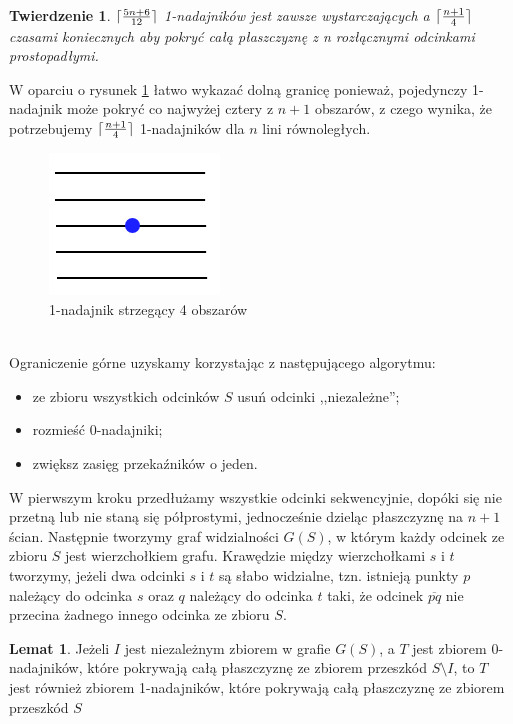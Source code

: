 \documentclass[brudnopis]{xmgr}
\DeclarePairedDelimiter\ceil{\lceil}{\rceil}
\newtheorem{Twierdzenie}{Twierdzenie} \theoremstyle{definition}
\newtheorem{Lemat}{Lemat} \theoremstyle{definition}
\begin{document}
\begin{Twierdzenie} \label{ograniczenie zbiór odcinków prostopadłych}
  $\ceil{\frac{5n+6}{12}}$ 1-nadajników jest zawsze wystarczających a $\ceil{\frac{n+1}{4}}$ czasami koniecznych aby pokryć całą płaszczyznę z n rozłącznymi odcinkami prostopadłymi.
\end{Twierdzenie}
\indent W oparciu o rysunek \ref{fig:ogr_dolne} łatwo wykazać dolną granicę ponieważ, pojedynczy 1-nadajnik może pokryć co najwyżej cztery z $n + 1$ obszarów, z czego wynika, że potrzebujemy $\ceil{\frac{n+1}{4}}$ 1-nadajników dla $n$ lini równoległych.
\begin{figure}[ht!]
  \centering
  \includegraphics{rysunki/k_nadajniki_ogr_dolne.png}
  \caption{1-nadajnik strzegący 4 obszarów}
  \label{fig:ogr_dolne}
\end{figure} 
\\\indent Ograniczenie górne uzyskamy korzystając z następującego algorytmu:
\begin{itemize}
  \item ze zbioru wszystkich odcinków $S$ usuń odcinki ,,niezależne'';
  \item rozmieść 0-nadajniki;
  \item zwiększ zasięg przekaźników o jeden.
\end{itemize}

W pierwszym kroku przedłużamy wszystkie odcinki sekwencyjnie, dopóki się nie przetną lub nie staną się półprostymi, jednocześnie dzieląc płaszczyznę na $n + 1$ ścian. Następnie tworzymy graf widzialności $G(S)$, w którym każdy odcinek ze zbioru $S$ jest wierzchołkiem grafu. Krawędzie między wierzchołkami $s$ i $t$ tworzymy, jeżeli dwa odcinki $s$ i $t$ są słabo widzialne, tzn. istnieją punkty $p$ należący do odcinka $s$ oraz $q$ należący do odcinka $t$ taki, że odcinek $\overline{pq}$ nie przecina żadnego innego odcinka ze zbioru $S$.

\begin{Lemat}\label{0-1-nadajniki}
  Jeżeli $I$ jest niezależnym zbiorem w grafie $G(S)$, a $T$ jest zbiorem 0-nadajników, które pokrywają całą płaszczyznę ze zbiorem przeszkód $S \setminus I$, to $T$ jest również zbiorem 1-nadajników, które pokrywają całą płaszczyznę ze zbiorem przeszkód $S$
\end{Lemat}
\end{document}
